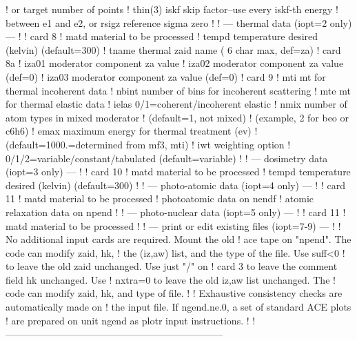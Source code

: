 \begin{ccode}
   !             or target number of points
   !    thin(3)  iskf skip factor--use every iskf-th energy
   !             between e1 and e2, or rsigz reference sigma zero
   !
   !   --- thermal data (iopt=2 only) ---
   !
   ! card 8
   !    matd     material to be processed
   !    tempd    temperature desired (kelvin) (default=300)
   !    tname    thermal zaid name ( 6 char max, def=za)
   ! card 8a
   !    iza01    moderator component za value
   !    iza02    moderator component za value (def=0)
   !    iza03    moderator component za value (def=0)
   ! card 9
   !    mti      mt for thermal incoherent data
   !    nbint    number of bins for incoherent scattering
   !    mte      mt for thermal elastic data
   !    ielas    0/1=coherent/incoherent elastic
   !    nmix     number of atom types in mixed moderator
   !             (default=1, not mixed)
   !             (example, 2 for beo or c6h6)
   !    emax     maximum energy for thermal treatment (ev)
   !             (default=1000.=determined from mf3, mti)
   !    iwt      weighting option
   !             0/1/2=variable/constant/tabulated (default=variable)
   !
   !   --- dosimetry data (iopt=3 only) ---
   !
   ! card 10
   !    matd     material to be processed
   !    tempd    temperature desired (kelvin) (default=300)
   !
   !   --- photo-atomic data (iopt=4 only) ---
   !
   ! card 11
   !    matd     material to be processed
   !             photoatomic data on nendf
   !             atomic relaxation data on npend
   !
   !   --- photo-nuclear data (iopt=5 only) ---
   !
   ! card 11
   !    matd     material to be processed
   !
   !   --- print or edit existing files (iopt=7-9) ---
   !
   !    No additional input cards are required.  Mount the old
   !    ace tape on "npend".  The code can modify zaid, hk,
   !    the (iz,aw) list, and the type of the file.  Use suff<0
   !    to leave the old zaid unchanged.  Use just "/" on
   !    card 3 to leave the comment field hk unchanged.  Use
   !    nxtra=0 to leave the old iz,aw list unchanged.  The
   !    code can modify zaid, hk, and type of file.
   !
   !    Exhaustive consistency checks are automatically made on
   !    the input file.  If ngend.ne.0, a set of standard ACE plots
   !    are prepared on unit ngend as plotr input instructions.
   !
   !--------------------------------------------------------------------

\end{ccode}
\normalsize

